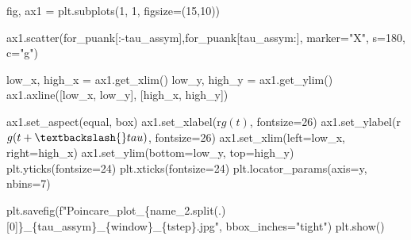 \documentclass[
  letterpaper,
]{report}
\newenvironment{Shaded}{\begin{snugshade}}{\end{snugshade}}
\newcommand{\DecValTok}[1]{\textcolor[rgb]{0.68,0.00,0.00}{#1}}
\newcommand{\NormalTok}[1]{\textcolor[rgb]{0.00,0.23,0.31}{#1}}
\newcommand{\OperatorTok}[1]{\textcolor[rgb]{0.37,0.37,0.37}{#1}}
\newcommand{\SpecialCharTok}[1]{\textcolor[rgb]{0.37,0.37,0.37}{#1}}
\newcommand{\SpecialStringTok}[1]{\textcolor[rgb]{0.13,0.47,0.30}{#1}}
\newcommand{\StringTok}[1]{\textcolor[rgb]{0.13,0.47,0.30}{#1}}
\newcommand{\VerbatimStringTok}[1]{\textcolor[rgb]{0.13,0.47,0.30}{#1}}
\begin{document}
\begin{Shaded}
\begin{Highlighting}[]
\NormalTok{fig, ax1 }\OperatorTok{=}\NormalTok{ plt.subplots(}\DecValTok{1}\NormalTok{, }\DecValTok{1}\NormalTok{, figsize}\OperatorTok{=}\NormalTok{(}\DecValTok{15}\NormalTok{,}\DecValTok{10}\NormalTok{))}

\NormalTok{ax1.scatter(for\_puank[:}\OperatorTok{{-}}\NormalTok{tau\_assym],for\_puank[tau\_assym:], marker}\OperatorTok{=}\StringTok{"X"}\NormalTok{, s}\OperatorTok{=}\DecValTok{180}\NormalTok{, c}\OperatorTok{=}\StringTok{"g"}\NormalTok{)}

\NormalTok{low\_x, high\_x }\OperatorTok{=}\NormalTok{ ax1.get\_xlim()}
\NormalTok{low\_y, high\_y }\OperatorTok{=}\NormalTok{ ax1.get\_ylim()}
\NormalTok{ax1.axline([low\_x, low\_y], [high\_x, high\_y])}

\NormalTok{ax1.set\_aspect(}\StringTok{\textquotesingle{}equal\textquotesingle{}}\NormalTok{, }\StringTok{\textquotesingle{}box\textquotesingle{}}\NormalTok{)}
\NormalTok{ax1.set\_xlabel(}\VerbatimStringTok{r\textquotesingle{}$g(t)$\textquotesingle{}}\NormalTok{, fontsize}\OperatorTok{=}\DecValTok{26}\NormalTok{)}
\NormalTok{ax1.set\_ylabel(}\VerbatimStringTok{r\textquotesingle{}$g(t+\textbackslash{}tau)$\textquotesingle{}}\NormalTok{, fontsize}\OperatorTok{=}\DecValTok{26}\NormalTok{) }
\NormalTok{ax1.set\_xlim(left}\OperatorTok{=}\NormalTok{low\_x, right}\OperatorTok{=}\NormalTok{high\_x)}
\NormalTok{ax1.set\_ylim(bottom}\OperatorTok{=}\NormalTok{low\_y, top}\OperatorTok{=}\NormalTok{high\_y)}
\NormalTok{plt.yticks(fontsize}\OperatorTok{=}\DecValTok{24}\NormalTok{)}
\NormalTok{plt.xticks(fontsize}\OperatorTok{=}\DecValTok{24}\NormalTok{)}
\NormalTok{plt.locator\_params(axis}\OperatorTok{=}\StringTok{\textquotesingle{}y\textquotesingle{}}\NormalTok{, nbins}\OperatorTok{=}\DecValTok{7}\NormalTok{)}

\NormalTok{plt.savefig(}\SpecialStringTok{f"Poincare\_plot\_}\SpecialCharTok{\{}\NormalTok{name\_2}\SpecialCharTok{.}\NormalTok{split(}\StringTok{\textquotesingle{}.\textquotesingle{}}\NormalTok{)[}\DecValTok{0}\NormalTok{]}\SpecialCharTok{\}}\SpecialStringTok{\_}\SpecialCharTok{\{}\NormalTok{tau\_assym}\SpecialCharTok{\}}\SpecialStringTok{\_}\SpecialCharTok{\{}\NormalTok{window}\SpecialCharTok{\}}\SpecialStringTok{\_}\SpecialCharTok{\{}\NormalTok{tstep}\SpecialCharTok{\}}\SpecialStringTok{.jpg"}\NormalTok{, bbox\_inches}\OperatorTok{=}\StringTok{"tight"}\NormalTok{)}
\NormalTok{plt.show()}
\end{Highlighting}
\end{Shaded}
\end{document}
